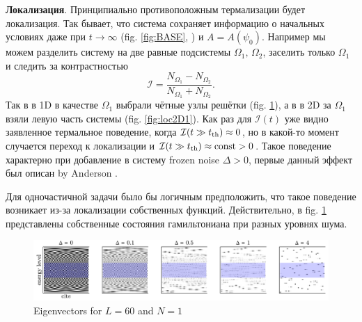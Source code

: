 
\textbf{Локализация}. Принципиально противоположным термализации будет локализация. Так бывает, что система сохраняет информацию о начальных условиях даже при $t \to \infty$ (fig. \ref{fig:BASE}, ) и $A = A(\psi_0)$.  Например мы можем разделить систему на две равные подсистемы $\Omega_1,\, \Omega_2$, заселить только $\Omega_1$ и следить за контрастностью
\begin{equation*}
	\mathcal{I} = \frac{N_{\Omega_1}-N_{\Omega_2}}{N_{\Omega_1}+N_{\Omega_2}}.
\end{equation*}
Так в \cite{schreiber_observation_2015} в 1D в качестве $\Omega_1$ выбрали чётные узлы решётки (fig. \ref{fig:loc1}), а в \cite{Choi_2016} в 2D за $\Omega_1$ взяли левую часть системы (fig. \ref{fig:loc2D1}). Как раз для $\mathcal{I}(t)$ уже видно заявленное термальное поведение, когда $\mathcal{I}(t \gg t_{\textnormal{th}}) \approx 0$, но в какой-то момент случается переход к локализации и $\mathcal{I} (t \gg t_{\textnormal{th}}) \approx \textnormal{const} > 0$. Такое поведение характерно при добавление в систему frozen noise $\Delta > 0$, первые данный эффект был описан by Anderson \cite{PhysRev.109.1492}.

Для одночастичной задачи было бы логичным предположить, что такое поведение возникает из-за локализации собственных функций. Действительно, в fig. \ref{fig:loc1} представлены собственные состояния гамильтониана при разных уровнях шума.  




\begin{figure}[h]
    \centering
    \includegraphics{imgs/evecs.pdf}
    \caption{Eigenvectors for $L=60$ and $N=1$}
    \label{fig:loc1}
\end{figure}

